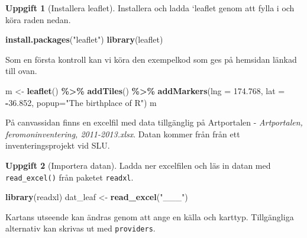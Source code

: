 \documentclass[
]{book}
\newenvironment{Shaded}{\begin{snugshade}}{\end{snugshade}}
\newcommand{\AttributeTok}[1]{\textcolor[rgb]{0.13,0.29,0.53}{#1}}
\newcommand{\FloatTok}[1]{\textcolor[rgb]{0.00,0.00,0.81}{#1}}
\newcommand{\FunctionTok}[1]{\textcolor[rgb]{0.13,0.29,0.53}{\textbf{#1}}}
\newcommand{\NormalTok}[1]{#1}
\newcommand{\OtherTok}[1]{\textcolor[rgb]{0.56,0.35,0.01}{#1}}
\newcommand{\SpecialCharTok}[1]{\textcolor[rgb]{0.81,0.36,0.00}{\textbf{#1}}}
\newcommand{\StringTok}[1]{\textcolor[rgb]{0.31,0.60,0.02}{#1}}
\theoremstyle{definition}
\theoremstyle{definition}
\theoremstyle{definition}
\newtheorem{exercise}{Uppgift}[chapter]
\theoremstyle{definition}
\theoremstyle{remark}
\begin{document}
\begin{exercise}[Installera leaflet]

Installera och ladda `leaflet genom att fylla i och köra raden nedan.

\begin{Shaded}
\begin{Highlighting}[]
\FunctionTok{install.packages}\NormalTok{(}\StringTok{"leaflet"}\NormalTok{)}
\FunctionTok{library}\NormalTok{(leaflet)}
\end{Highlighting}
\end{Shaded}

\end{exercise}

Som en första kontroll kan vi köra den exempelkod som ges på hemsidan länkad till ovan.

\begin{Shaded}
\begin{Highlighting}[]
\NormalTok{m }\OtherTok{\textless{}{-}} \FunctionTok{leaflet}\NormalTok{() }\SpecialCharTok{\%\textgreater{}\%}
  \FunctionTok{addTiles}\NormalTok{() }\SpecialCharTok{\%\textgreater{}\%}
  \FunctionTok{addMarkers}\NormalTok{(}\AttributeTok{lng =} \FloatTok{174.768}\NormalTok{, }\AttributeTok{lat =} \SpecialCharTok{{-}}\FloatTok{36.852}\NormalTok{, }\AttributeTok{popup=}\StringTok{"The birthplace of R"}\NormalTok{)}
\NormalTok{m}
\end{Highlighting}
\end{Shaded}

På canvassidan finns en excelfil med data tillgänglig på Artportalen - \emph{Artportalen, feromoninventering, 2011-2013.xlsx}. Datan kommer från från ett inventeringsprojekt vid SLU.

\begin{exercise}[Importera datan]

Ladda ner excelfilen och läs in datan med \texttt{read\_excel()} från paketet \texttt{readxl}.

\begin{Shaded}
\begin{Highlighting}[]
\FunctionTok{library}\NormalTok{(readxl)}
\NormalTok{dat\_leaf }\OtherTok{\textless{}{-}} \FunctionTok{read\_excel}\NormalTok{(}\StringTok{"\_\_\_"}\NormalTok{)}
\end{Highlighting}
\end{Shaded}

\end{exercise}

Kartans utseende kan ändras genom att ange en källa och karttyp. Tillgängliga alternativ kan skrivas ut med \texttt{providers}.
\end{document}
